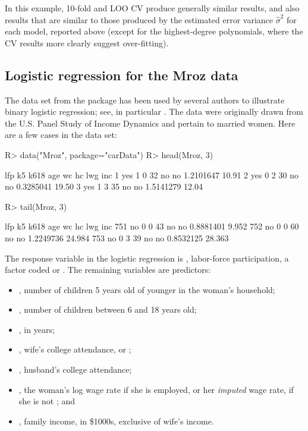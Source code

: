 \documentclass[
]{jss}
\providecommand{\tightlist}{%
  \setlength{\itemsep}{0pt}\setlength{\parskip}{0pt}}
\begin{document}
In this example, 10-fold and LOO CV produce generally similar results,
and also results that are similar to those produced by the estimated
error variance \(\widehat{\sigma}^2\) for each model, reported above
(except for the highest-degree polynomials, where the CV results more
clearly suggest over-fitting).

\hypertarget{logistic-regression-for-the-mroz-data}{%
\subsection{Logistic regression for the Mroz
data}\label{logistic-regression-for-the-mroz-data}}

The  data set from the  package
\citep[associated with][]{FoxWeisberg:2019} has been used by several
authors to illustrate binary logistic regression; see, in particular
\citet{FoxWeisberg:2019}. The data were originally drawn from the U.S.
Panel Study of Income Dynamics and pertain to married women. Here are a
few cases in the data set:

\begin{CodeChunk}
\begin{CodeInput}
R> data("Mroz", package="carData")
R> head(Mroz, 3)
\end{CodeInput}
\begin{CodeOutput}
  lfp k5 k618 age wc hc       lwg   inc
1 yes  1    0  32 no no 1.2101647 10.91
2 yes  0    2  30 no no 0.3285041 19.50
3 yes  1    3  35 no no 1.5141279 12.04
\end{CodeOutput}
\begin{CodeInput}
R> tail(Mroz, 3)
\end{CodeInput}
\begin{CodeOutput}
    lfp k5 k618 age wc hc       lwg    inc
751  no  0    0  43 no no 0.8881401  9.952
752  no  0    0  60 no no 1.2249736 24.984
753  no  0    3  39 no no 0.8532125 28.363
\end{CodeOutput}
\end{CodeChunk}

The response variable in the logistic regression is ,
labor-force participation, a factor coded  or .
The remaining variables are predictors:

\begin{itemize}
\tightlist
\item
  , number of children 5 years old of younger in the woman's
  household;
\item
  , number of children between 6 and 18 years old;
\item
  , in years;
\item
  , wife's college attendance,  or ;
\item
  , husband's college attendance;
\item
  , the woman's log wage rate if she is employed, or her
  \emph{imputed} wage rate, if she is not \citep[a variable that][ show
  is problematically defined]{FoxWeisberg:2019}; and
\item
  , family income, in \$1000s, exclusive of wife's income.
\end{itemize}
\end{document}
